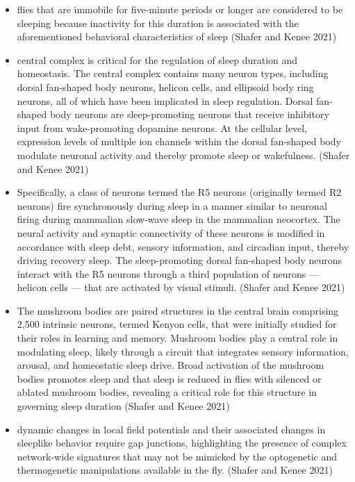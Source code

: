 \documentclass[11pt]{article}
\begin{document}
\begin{itemize}
    \item flies that are immobile for five-minute periods or longer are considered to be sleeping because inactivity for this duration is associated with the aforementioned behavioral characteristics of sleep
    \cite{shaferRegulationDrosophilaSleep2021} (Shafer and Kenee 2021)

    \item central complex is critical for the regulation of sleep duration and homeostasis. The central complex contains many neuron types, including dorsal fan-shaped body neurons, helicon cells, and ellipsoid body ring neurons, all of which have been implicated in sleep regulation.
    Dorsal fan-shaped body neurons are sleep-promoting neurons that receive inhibitory input from wake-promoting dopamine neurons.
    At the cellular level, expression levels of multiple ion channels within the dorsal fan-shaped body modulate neuronal activity and thereby promote sleep or wakefulness.
    \cite{shaferRegulationDrosophilaSleep2021} (Shafer and Kenee 2021)

    \item Specifically, a class of neurons termed the R5 neurons (originally termed R2 neurons) fire synchronously during sleep in a manner similar to neuronal firing during mammalian slow-wave sleep in the mammalian neocortex.
    The neural activity and synaptic connectivity of these neurons is modified in accordance with sleep debt, sensory information, and circadian input, thereby driving recovery sleep.
    The sleep-promoting dorsal fan-shaped body neurons interact with the R5 neurons through a third population of
    neurons — helicon cells — that are activated by visual stimuli.
    \cite{shaferRegulationDrosophilaSleep2021} (Shafer and Kenee 2021)

    \item The mushroom bodies are paired structures in the central brain comprising 2,500 intrinsic neurons, termed Kenyon cells, that were initially studied for their roles in learning and memory.
    Mushroom bodies play a central role in modulating sleep, likely through a circuit that integrates sensory information, arousal, and homeostatic sleep drive.
    Broad activation of the mushroom bodies promotes sleep and that sleep is reduced in flies with silenced or ablated mushroom bodies, revealing a critical role for this structure in governing sleep duration
    \cite{shaferRegulationDrosophilaSleep2021} (Shafer and Kenee 2021)

    \item dynamic changes in local field potentials and their associated changes in sleeplike behavior require gap junctions, highlighting the presence of complex network-wide signatures that may not be mimicked by the optogenetic and thermogenetic manipulations available in the fly.
    \cite{shaferRegulationDrosophilaSleep2021} (Shafer and Kenee 2021)


\end{itemize}
\end{document}
